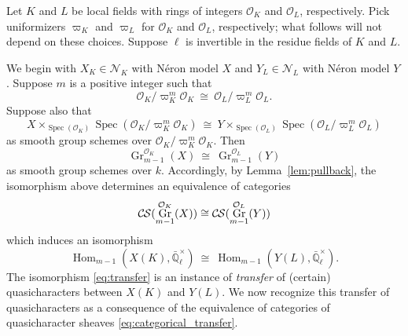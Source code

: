 \documentclass[10pt]{amsart}
\theoremstyle{plain}
\theoremstyle{definition}
\newcommand{\EE}{\mathbb{\bar Q}_\ell}
\newcommand{\OK}{\mathcal{O}_K}
\newcommand{\OL}{\mathcal{O}_L}
\newcommand{\Fq}{k}
\newcommand{\EEx}{\EE^\times}
\DeclareMathOperator{\Hom}{Hom}
\DeclareMathOperator{\Gr}{Gr}
\newcommand{\Spec}[1]{{\operatorname{Spec}(#1)}}
\newcommand{\iso}{{\ \cong\ }}
\newcommand{\CS}{{\mathcal{C\hskip-0.8pt S}}}
\begin{document}
Let $K$ and $L$ be local fields with rings of integers $\OK$ and $\OL$, respectively. 
Pick uniformizers $\varpi_K$ and $\varpi_L$ for $\OK$ and $\OL$, respectively;
what follows will not depend on these choices.
Suppose $\ell$ is invertible in the residue fields of $K$ and $L$.

We begin with $X_K\in \mathcal{N}_K$ with N\'eron model $X$ and $Y_{L}\in \mathcal{N}_L$ with N\'eron model $Y$.
Suppose $m$ is a positive integer such that 
\[
\OK/\varpi_K^{m}\OK \iso \OL/\varpi_L^{m}\OL.
\]
Suppose also that
\begin{equation}\label{eq:schematic_transfer}
X \times_{\Spec{\OK}} \Spec{\OK/\varpi_K^{m}\OK} \iso Y \times_{\Spec{\OL}} \Spec{\OL/\varpi_L^{m}\OL}
\end{equation}
as smooth group schemes over $\OK/\varpi_K^{m}\OK$. 
Then
\[
\Gr^{\OK}_{m-1}(X) \iso \Gr^{\OL}_{m-1}(Y)
\]
as smooth group schemes over $\Fq$.  Accordingly, by Lemma~\ref{lem:pullback},
the isomorphism above determines an equivalence of categories
\begin{equation}\label{eq:categorical_transfer}
\CS(\Gr^{\OK}_{m-1}(X)) \cong \CS(\Gr^{\OL}_{m-1}(Y))
\end{equation}
which induces an isomorphism
\begin{equation}\label{eq:transfer}
\Hom_{m-1}(X(K),\EEx)  \iso  \Hom_{m-1}(Y(L),\EEx).
\end{equation}
The isomorphism \eqref{eq:transfer} is an instance of {\it transfer} of (certain) quasicharacters between $X(K)$ and $Y(L)$. 
We now recognize this transfer of quasicharacters as a consequence of the
equivalence of categories of quasicharacter sheaves \eqref{eq:categorical_transfer}.
\end{document}
